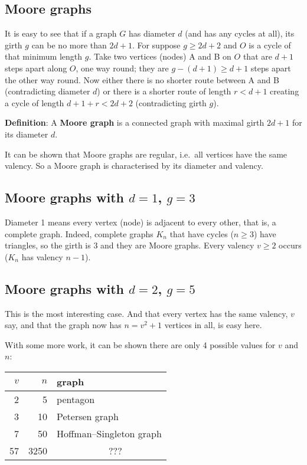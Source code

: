 \documentclass[12pt]{article}
\let\ge\geqslant
\begin{document}

\subsection*{Moore graphs}

It is easy to see that if a graph $G$ has diameter $d$ (and has any cycles
at all), its girth $g$ can be no more than $2d+1$. For suppose $g\ge2d+2$ and
$O$ is a cycle of that minimum length $g$. Take two vertices (nodes) A and B
on $O$ that are $d+1$ steps apart along $O$, one way round; they are $g-(d+1)
\ge d+1$ steps apart the other way round. Now either there is no shorter
route between A and B (contradicting diameter $d$) or there is a shorter route
of length $r\lt d+1$ creating a cycle of length $d+1+r\lt 2d+2$
(contradicting girth $g$).

{\bf Definition}: A {\bf Moore graph} is a connected graph with 
maximal girth $2d+1$ for its diameter $d$.

It can be shown that Moore graphs are regular, i.e.\ all vertices have the
same valency. So a Moore graph is characterised by its diameter and valency.

\clearpage
\subsection*{Moore graphs with $d=1$, $g=3$}

Diameter 1 means every vertex (node) is adjacent to every other, that is, a
complete graph. Indeed, complete graphs $K_n$ that have cycles ($n\ge3$) have
triangles, so the girth is 3 and they are Moore graphs. Every valency $v\ge2$
occurs ($K_n$ has valency $n-1$).

\clearpage
\subsection*{Moore graphs with $d=2$, $g=5$}

This is the most interesting case. And  that every vertex has the same valency, $v$ say, and that the graph now has $n=v^2+1$ vertices in all, is easy here.

With some more work, it can be shown there are only 4 possible values for $v$
and $n$:

\begin{center}
\begin{tabular}{|r|r|l|}
   $v$ & $n$ & graph                        \\\hline
                                              \hline
    2  &    5  & pentagon                   \\\hline
    3  &   10  & Petersen graph             \\\hline
    7  &   50  & Hoffman--Singleton graph   \\\hline
   57  & 3250  & \ \ \ \ \ \ \ \ \ \ \ ???  \\\hline
\end{tabular}
\end{center}
\end{document}
